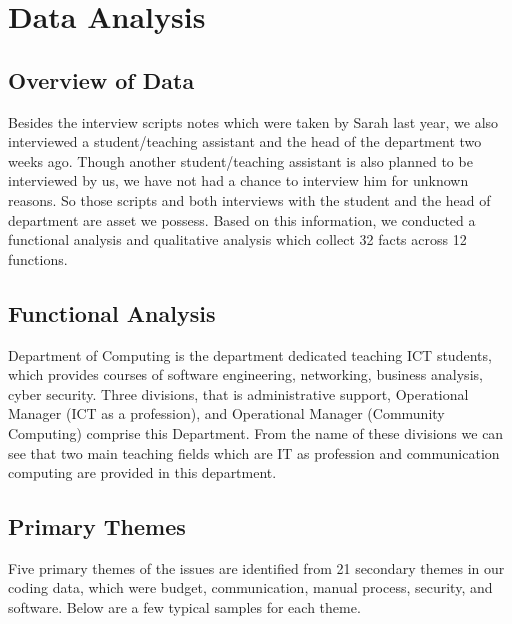 
\section{Data Analysis}

\subsection{Overview of Data}

Besides the interview scripts notes which were taken by Sarah last year, we also interviewed a student/teaching assistant and the head of the department two weeks ago. Though another student/teaching assistant is also planned to be interviewed by us, we have not had a chance to interview him for unknown reasons. So those scripts and both interviews with the student and the head of department are asset we possess. Based on this information, we conducted a functional analysis and qualitative analysis which collect 32 facts across 12 functions.

\subsection{Functional Analysis}

Department of Computing is the department dedicated teaching ICT students, which provides courses of software engineering, networking, business analysis, cyber security. Three divisions, that is administrative support, Operational Manager (ICT as a profession), and Operational Manager (Community Computing) comprise this Department. From the name of these divisions we can see that two main teaching fields which are IT as profession and communication computing are provided in this department.

\subsection{Primary Themes}
Five primary themes of the issues are identified from 21 secondary themes in our coding data, which were budget, communication, manual process, security, and software. Below are a few typical samples for each theme.

